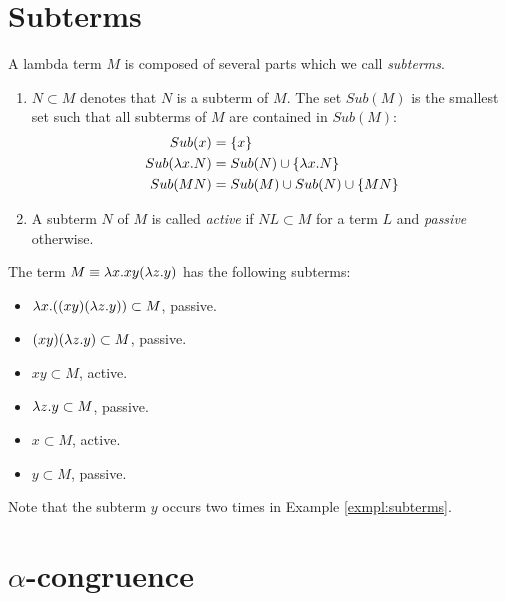 \section{Subterms}

A lambda term $M$ is composed of several parts which we call \emph{subterms}.
\begin{definition}\mbox{}
	\begin{enumerate}
		\item $N\subset M$ denotes that $N$ is a subterm of $M$. The set $Sub(M)$ is the 
		smallest set such that all subterms of $M$ are contained in $Sub(M)$:
		\begin{align*}
			Sub(x) &=\{x\} \\
			Sub(\lam{x}{N}) &= Sub(N) \cup \{\lam{x}{N}\} \\
			Sub(M N) &= Sub(M) \cup Sub(N)  \cup \{M N\} %
		\end{align*}
		\item A subterm $N$ of $M$ is called \emph{active} if $N L \subset M$ 
		for a term $L$ and \emph{passive} otherwise.
	\end{enumerate}
\end{definition}
\begin{example}\label{exmpl:subterms}
	The term $M\equiv\lambda x.xy(\lambda z.y)$ has the following subterms:
	\begin{itemize}
		\item $\lambda x.((xy)(\lambda z.y))\subset M$, passive.
		\item $(xy)(\lambda z.y)\subset M$, passive.
		\item $xy\subset M$, active.
		\item $\lambda z.y\subset M$, passive.
		\item $x\subset M$, active.
		\item $y\subset M$, passive.
	\end{itemize}
\end{example}
Note that the subterm $y$ occurs two times in Example \ref{exmpl:subterms}.

\section{$\alpha$-congruence}

